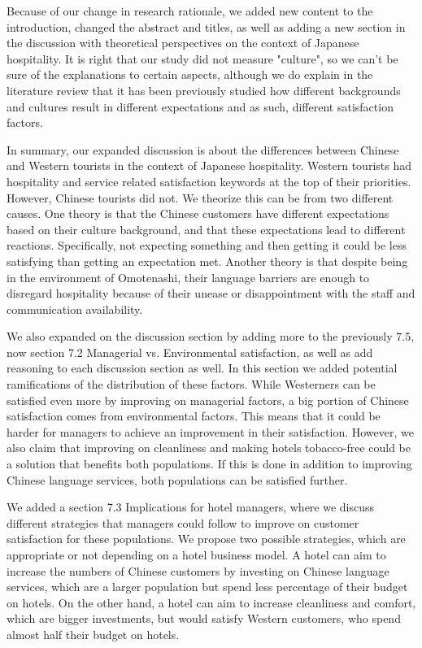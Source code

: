 \documentclass{letter}
\begin{document}
Because of our change in research rationale, we added new content to the introduction, changed the abstract and titles, as well as adding a new section in the discussion with theoretical perspectives on the context of Japanese hospitality. It is right that our study did not measure "culture", so we can't be sure of the explanations to certain aspects, although we do explain in the literature review that it has been previously studied how different backgrounds and cultures result in different expectations and as such, different satisfaction factors. 

In summary, our expanded discussion is about the differences between Chinese and Western tourists in the context of Japanese hospitality. Western tourists had hospitality and service related satisfaction keywords at the top of their priorities. However, Chinese tourists did not. We theorize this can be from two different causes. One theory is that the Chinese customers have different expectations based on their culture background, and that these expectations lead to different reactions. Specifically, not expecting something and then getting it could be less satisfying than getting an expectation met. Another theory is that despite being in the environment of Omotenashi, their language barriers are enough to disregard hospitality because of their unease or disappointment with the staff and communication availability.

We also expanded on the discussion section by adding more to the previously 7.5, now section 7.2 Managerial vs. Environmental satisfaction, as well as add reasoning to each discussion section as well. In this section we added potential ramifications of the distribution of these factors. While Westerners can be satisfied even more by improving on managerial factors, a big portion of Chinese satisfaction comes from environmental factors. This means that it could be harder for managers to achieve an improvement in their satisfaction. However, we also claim that improving on cleanliness and making hotels tobacco-free could be a solution that benefits both populations. If this is done in addition to improving Chinese language services, both populations can be satisfied further.

We added a section 7.3 Implications for hotel managers, where we discuss different strategies that managers could follow to improve on customer satisfaction for these populations. We propose two possible strategies, which are appropriate or not depending on a hotel business model. A hotel can aim to increase the numbers of Chinese customers by investing on Chinese language services, which are a larger population but spend less percentage of their budget on hotels. On the other hand, a hotel can aim to increase cleanliness and comfort, which are bigger investments, but would satisfy Western customers, who spend almost half their budget on hotels.
\end{document}
